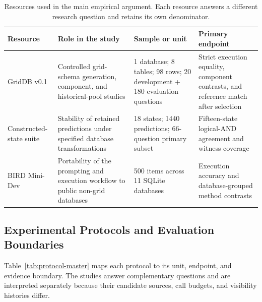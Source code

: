 \documentclass[information,article,submit,moreauthors]{Definitions/mdpi}
\begin{document}
\begin{table}[htbp]
\caption{Resources used in the main empirical argument. Each resource answers a different research question and retains its own denominator.}
\label{tab:resources}
\centering
\small
\setlength{\tabcolsep}{2pt}
\begin{tabular}{p{2.6cm}p{4.5cm}p{3.0cm}p{3.0cm}}
\toprule
Resource & Role in the study & Sample or unit & Primary endpoint\\
\midrule
GridDB v0.1 & Controlled grid-schema generation, component, and historical-pool studies & 1 database; 8 tables; 98 rows; 20 development + 180 evaluation questions & Strict execution equality, component contrasts, and reference match after selection\\
Constructed-state suite & Stability of retained predictions under specified database transformations & 18 states; 1440 predictions; 66-question primary subset & Fifteen-state logical-AND agreement and witness coverage\\
BIRD Mini-Dev & Portability of the prompting and execution workflow to public non-grid databases & 500 items across 11 SQLite databases & Execution accuracy and database-grouped method contrasts\\
\bottomrule
\end{tabular}
\end{table}

\subsection{Experimental Protocols and Evaluation Boundaries}

Table~\ref{tab:protocol-master} maps each protocol to its unit, endpoint, and evidence boundary. The studies answer complementary questions and are interpreted separately because their candidate sources, call budgets, and visibility histories differ.
\end{document}
